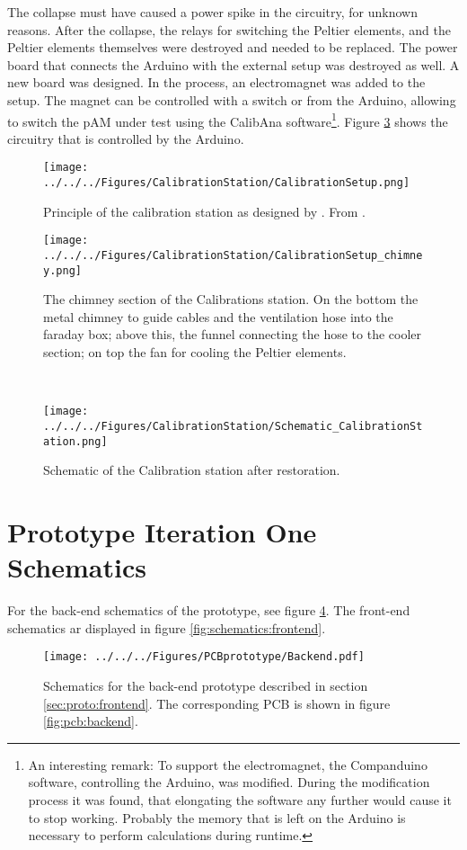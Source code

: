 The collapse must have caused a power spike in the circuitry, for unknown reasons. After the collapse, the relays for switching the Peltier elements, and the Peltier elements themselves were destroyed and needed to be replaced.
The power board that connects the Arduino with the external setup was destroyed as well. A new board was designed. In the process, an electromagnet was added to the setup. The magnet can be controlled with a switch or from the Arduino, allowing to switch the \ac{pAM} under test using the CalibAna software\footnote{An interesting remark: To support the electromagnet, the Companduino software, controlling the Arduino, was modified. During the modification process it was found, that elongating the software any further would cause it to stop working. Probably the memory that is left on the Arduino is necessary to perform calculations during runtime.}.
Figure \ref{fig:appendix:calib:schematic} shows the circuitry that is controlled by the Arduino.
\begin{figure}
	\centering
	\texttt{[image: ../../../Figures/CalibrationStation/CalibrationSetup.png]}
	\caption{Principle of the calibration station as designed by \cite{roedel}. From \cite{roedel_talk}.}
	\label{fig:appendix:calib:setup}
\end{figure}
\begin{figure}
	\centering
	\texttt{[image: ../../../Figures/CalibrationStation/CalibrationSetup\_chimney.png]}
	\caption{The chimney section of the Calibrations station. On the bottom the metal chimney to guide cables and the ventilation hose into the faraday box; above this, the funnel connecting the hose to the cooler section; on top the fan for cooling the Peltier elements.}
	\label{fig:appendix:calib:chimney}
\end{figure}\\
\begin{figure}
	\centering
	\texttt{[image: ../../../Figures/CalibrationStation/Schematic\_CalibrationStation.png]}
	\caption{Schematic of the Calibration station after restoration.}
	\label{fig:appendix:calib:schematic}
\end{figure}

\section{Prototype Iteration One Schematics}
For the back-end schematics of the prototype, see figure \ref{fig:schematics:backend}. The front-end schematics ar displayed in figure \ref{fig:schematics:frontend}.
\label{sec:app:proto1:schematics}
\begin{figure}
	\centering
	\texttt{[image: ../../../Figures/PCBprototype/Backend.pdf]}
	\caption{Schematics for the back-end prototype described in section \ref{sec:proto:frontend}. The corresponding PCB is shown in figure \ref{fig:pcb:backend}.}
	\label{fig:schematics:backend}
\end{figure}

